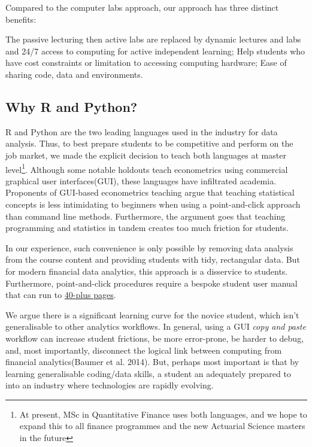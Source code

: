 \documentclass{article}
\begin{document}
Compared to the computer labs approach, our approach has three distinct
benefits:

The passive lecturing then active labs are replaced by dynamic lectures
and labs and 24/7 access to computing for active independent learning;
Help students who have cost constraints or limitation to accessing
computing hardware; Ease of sharing code, data and environments.

\hypertarget{why-r-and-python}{%
\subsection{Why R and Python?}\label{why-r-and-python}}

R and Python are the two leading languages used in the industry for data
analysis. Thus, to best prepare students to be competitive and perform
on the job market, we made the explicit decision to teach both languages
at master level\footnote{At present, MSc in Quantitative Finance uses
  both languages, and we hope to expand this to all finance programmes
  and the new Actuarial Science masters in the future}. Although some
notable holdouts teach econometrics using commercial graphical user
interfaces(GUI), these languages have infiltrated academia. Proponents
of GUI-based econometrics teaching argue that teaching statistical
concepts is less intimidating to beginners when using a point-and-click
approach than command line methods. Furthermore, the argument goes that
teaching programming and statistics in tandem creates too much friction
for students.

In our experience, such convenience is only possible by removing data
analysis from the course content and providing students with tidy,
rectangular data. But for modern financial data analytics, this approach
is a disservice to students. Furthermore, point-and-click procedures
require a bespoke student user manual that can run to
\href{https://github.com/barryquinn1/FMLmaterial/blob/27d8094fee39fa0284d3a0bfc10e38dcd3bebcac/Introducing\%20Stata.pdf}{40-plus
pages}.

We argue there is a significant learning curve for the novice student,
which isn't generalisable to other analytics workflows. In general,
using a GUI \emph{copy and paste} workflow can increase student
frictions, be more error-prone, be harder to debug, and, most
importantly, disconnect the logical link between computing from
financial analytics(Baumer et al. 2014). But, perhaps most important is
that by learning generalisable coding/data skills, a student an
adequately prepared to into an industry where technologies are rapidly
evolving.
\end{document}
